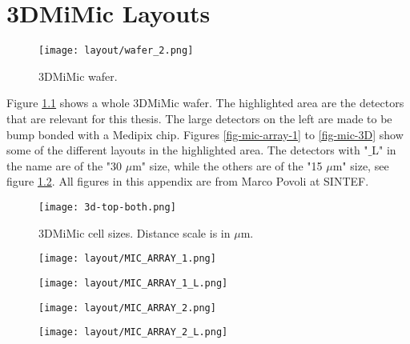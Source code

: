 \documentclass[../main/thesis.tex]{subfiles}
\begin{document}
\chapter{3DMiMic Layouts}
\label{a-3dmimic-layout}

\begin{figure}[h]
	\centering
	\texttt{[image: layout/wafer\_2.png]}
	\caption{3DMiMic wafer.}
	\label{fig-wafer} 
\end{figure}

Figure \ref{fig-wafer} shows a whole 3DMiMic wafer. The highlighted area are the detectors that are relevant for this thesis. The large detectors on the left are made to be bump bonded with a Medipix chip. Figures \ref{fig-mic-array-1} to \ref{fig-mic-3D} show some of the different layouts in the highlighted area. The detectors with "$\_$L" in the name are of the "30 $\mu$m" size, while the others are of the "15 $\mu$m" size, see figure \ref{fig-top-both}. All figures in this appendix are from Marco Povoli at SINTEF.

\begin{figure}%
	\centering
	\texttt{[image: 3d-top-both.png]}
	\caption{3DMiMic cell sizes. Distance scale is in $\mu$m.}
	\label{fig-top-both} 
\end{figure}

\begin{figure}
	\centering
	\begin{minipage}{.5\textwidth}
		\centering
		\texttt{[image: layout/MIC\_ARRAY\_1.png]}
		\label{fig-mic-array-1}
	\end{minipage}%
	\begin{minipage}{.5\textwidth}
		\centering
		\texttt{[image: layout/MIC\_ARRAY\_1\_L.png]}
		\label{fig-mic-array-1-L}
	\end{minipage}
\end{figure}

\begin{figure}
	\centering
	\begin{minipage}{.5\textwidth}
		\centering
		\texttt{[image: layout/MIC\_ARRAY\_2.png]}
		\label{fig-mic-array-2}
	\end{minipage}%
	\begin{minipage}{.5\textwidth}
		\centering
		\texttt{[image: layout/MIC\_ARRAY\_2\_L.png]}
		\label{fig-mic-array-2-L}
	\end{minipage}
\end{figure}
\end{document}
